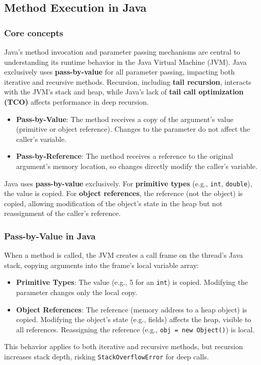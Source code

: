 \documentclass{article}
\begin{document}
\subsection{Method Execution in Java}

\subsubsection{Core concepts}
Java’s method invocation and parameter passing mechanisms are central to understanding its runtime behavior in the Java Virtual Machine (JVM). Java exclusively uses \textbf{pass-by-value} for all parameter passing, impacting both iterative and recursive methods. Recursion, including \textbf{tail recursion}, interacts with the JVM’s stack and heap, while Java’s lack of \textbf{tail call optimization (TCO)} affects performance in deep recursion. 
\begin{itemize}
	\item \textbf{Pass-by-Value}: The method receives a copy of the argument’s value (primitive or object reference). Changes to the parameter do not affect the caller’s variable.
	\item \textbf{Pass-by-Reference}: The method receives a reference to the original argument’s memory location, so changes directly modify the caller’s variable.
\end{itemize}
Java uses \textbf{pass-by-value} exclusively. For \textbf{primitive types} (e.g., \texttt{int}, \texttt{double}), the value is copied. For \textbf{object references}, the reference (not the object) is copied, allowing modification of the object’s state in the heap but not reassignment of the caller’s reference.

\subsubsection{Pass-by-Value in Java}
When a method is called, the JVM creates a call frame on the thread’s Java stack, copying arguments into the frame’s local variable array:
\begin{itemize}
	\item \textbf{Primitive Types}: The value (e.g., 5 for an \texttt{int}) is copied. Modifying the parameter changes only the local copy.
	\item \textbf{Object References}: The reference (memory address to a heap object) is copied. Modifying the object’s state (e.g., fields) affects the heap, visible to all references. Reassigning the reference (e.g., \texttt{obj = new Object()}) is local.
\end{itemize}
This behavior applies to both iterative and recursive methods, but recursion increases stack depth, risking \texttt{StackOverflowError} for deep calls.
\end{document}
